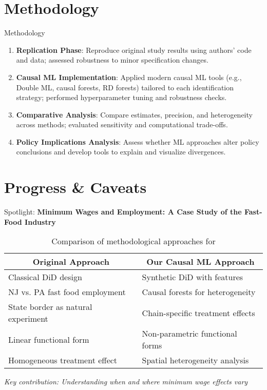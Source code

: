 \documentclass{beamer}
\begin{document}
    \section{Methodology}
    \begin{frame}{Methodology}
        \begin{enumerate}
            \item \textbf{Replication Phase}: Reproduce original study results using authors’ code and data; assessed robustness to minor specification changes.  
            \item \textbf{Causal ML Implementation}: Applied modern causal ML tools (e.g., Double ML, causal forests, RD forests) tailored to each identification strategy; performed hyperparameter tuning and robustness checks.  
            \item \textbf{Comparative Analysis}: Compare estimates, precision, and heterogeneity across methods; evaluated sensitivity and computational trade-offs.  
            \item \textbf{Policy Implications Analysis}: Assess whether ML approaches alter policy conclusions and develop tools to explain and visualize divergences.
        \end{enumerate}
    \end{frame}

    \section{Progress \& Caveats}

    \begin{frame}{Spotlight: \textcite{card1994minimum}}
    \textbf{Minimum Wages and Employment: A Case Study of the Fast-Food Industry}
    
    \begin{table}
        \centering
        \footnotesize
        \begin{tabular}{p{}p{}}
            \toprule
            \multicolumn{1}{c}{\textbf{Original Approach}} & \multicolumn{1}{c}{\textbf{Our Causal ML Approach}} \\
            \midrule
            Classical DiD design & Synthetic DiD with  features \\
            NJ vs. PA fast food employment & Causal forests for heterogeneity \\
            State border as natural experiment & Chain-specific treatment effects \\
            Linear functional form & Non-parametric functional forms \\
            Homogeneous treatment effect & Spatial heterogeneity analysis \\
            \bottomrule
        \end{tabular}
        \caption{Comparison of methodological approaches for \textcite{card1994minimum}}
        \label{tab:card_krueger_comparison}
    \end{table}
    \begin{center}
    \textit{Key contribution: Understanding when and where minimum wage effects vary}
    \end{center}
    \end{frame}
\end{document}
